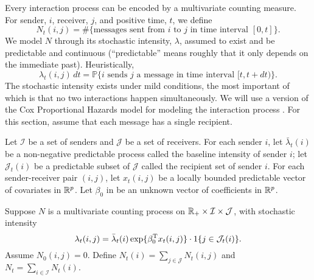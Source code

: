 \documentclass[aoas,preprint]{imsart}
\begin{document}
Every interaction process can be encoded by a multivariate counting measure.
For sender, $i$, receiver, $j$, and positive time, $t$, we define
\[
    N_t(i,j)
        =
        \#\{\text{messages sent from $i$ to $j$ in time interval $[0,t]$}\}.
\]
We model $N$ through its stochastic intensity, $\lambda$, assumed to
exist and be predictable and continuous (``predictable'' means roughly that
it only depends on the immediate past).  Heuristically,
\[
    \lambda_t(i,j) \, dt
        =
        \mathbb{P}\{
            \text{$i$ sends $j$ a message in time interval $[t,t+dt)$}
        \}.
\]
The stochastic intensity exists
under mild conditions, the most important of which is that no two interactions
happen simultaneously.
We will use a version of the Cox Proportional Hazards model for modeling
the interaction process \cite{cox1972regression}.
For this section, assume that each message has a single recipient.



Let $\mathcal{I}$ be a set of senders and $\mathcal{J}$ be a set of
receivers.  
For each sender $i$, let $\bar \lambda_t(i)$ be a non-negative predictable
process called the baseline intensity of sender $i$; let
$\mathcal{J}_t(i)$ be a predictable subset of $\mathcal{J}$ called the 
recipient set of sender $i$.
For each sender-receiver pair $(i,j)$, let $x_t(i,j)$ be a locally bounded
predictable vector of covariates in $\mathbb{R}^p$.  Let $\beta_0$ in
be an unknown vector of coefficients in  $\mathbb{R}^p$.

Suppose $N$ is a multivariate counting process on 
$\mathbb{R}_+ \times \mathcal{I} \times \mathcal{J}$,
with stochastic intensity
\begin{equation}\label{E:cox-intensity}
    \lambda_t(i,j)
        =
        \bar \lambda_t(i)
        \exp\{ \beta_0^\trans x_t(i, j) \}
        \cdot
        1{\{j \in \mathcal{J}_t(i)\}}.
\end{equation}
Assume $N_0(i,j) = 0$.  Define
\(
    N_t(i) = \sum_{j \in \mathcal{J}} N_t(i,j)
\)
and
\(
    N_t = \sum_{i \in \mathcal{I}} N_t(i).
\)
\end{document}
